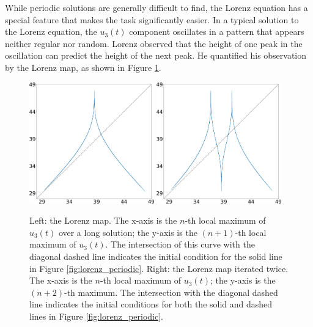 While periodic solutions are generally difficult to find,
the Lorenz equation has a special feature that makes the task significantly
easier.  In a typical solution to the Lorenz equation, the 
$u_3(t)$ component oscillates in a pattern that appears neither regular nor random.  Lorenz
observed that the height of one peak in the oscillation can predict the height of the next peak.  He quantified his observation by the Lorenz map,
as shown in Figure \ref{fig:lorenz_map}.

\begin{figure}\centering
\includegraphics[width=0.48\textwidth]{figure/lorenz_zmax_10_28_2.6666666666666665.png}
\hspace{0.02\textwidth}
\includegraphics[width=0.48\textwidth]{figure/lorenz_zmax2_10_28_2.6666666666666665.png}
\caption{Left: the Lorenz map.  The x-axis is the $n$-th local maximum of $u_3(t)$ over a
long solution; the y-axis is the $(n+1)$-th local maximum of $u_3(t)$.  The intersection of this curve
with the diagonal dashed line indicates the initial condition for the solid line
in Figure \ref{fig:lorenz_periodic}.
Right: the Lorenz map iterated twice.  The x-axis is the $n$-th local maximum
of $u_3(t)$; the y-axis is the $(n+2)$-th maximum.  The intersection with the diagonal dashed
line indicates the initial conditions for both the solid and dashed lines in
Figure \ref{fig:lorenz_periodic}.}
\label{fig:lorenz_map}
\end{figure}

